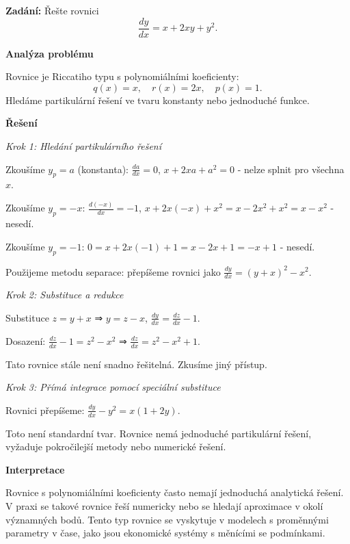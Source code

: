     \begin{example}
    \label{ex:l2-riccati-a2-lehky-linearni}
    
    \noindent\textbf{Zadání:} Řešte rovnici
    \[
    \frac{dy}{dx} = x + 2xy + y^2.
    \]
    
    \vspace{1.5\baselineskip}
    
    \noindent\textbf{Analýza problému}
    
    \noindent Rovnice je Riccatiho typu s polynomiálními koeficienty:
    \[
    q(x) = x, \quad r(x) = 2x, \quad p(x) = 1.
    \]
    Hledáme partikulární řešení ve tvaru konstanty nebo jednoduché funkce.
    
    \vspace{1.5\baselineskip}
    
    \noindent\textbf{Řešení}
    
    \noindent\textit{Krok 1: Hledání partikulárního řešení}
    
    Zkoušíme $y_p = a$ (konstanta): 
    $\frac{da}{dx} = 0$, $x + 2xa + a^2 = 0$ - nelze splnit pro všechna $x$.
    
    Zkoušíme $y_p = -x$: 
    $\frac{d(-x)}{dx} = -1$, $x + 2x(-x) + x^2 = x - 2x^2 + x^2 = x - x^2$ - nesedí.
    
    Zkoušíme $y_p = -1$: 
    $0 = x + 2x(-1) + 1 = x - 2x + 1 = -x + 1$ - nesedí.
    
    Použijeme metodu separace: přepíšeme rovnici jako $\frac{dy}{dx} = (y + x)^2 - x^2$.
    
    \noindent\textit{Krok 2: Substituce a redukce}
    
    Substituce $z = y + x$ ⇒ $y = z - x$, $\frac{dy}{dx} = \frac{dz}{dx} - 1$.
    
    Dosazení: $\frac{dz}{dx} - 1 = z^2 - x^2$ ⇒ $\frac{dz}{dx} = z^2 - x^2 + 1$.
    
    Tato rovnice stále není snadno řešitelná. Zkusíme jiný přístup.
    
    \noindent\textit{Krok 3: Přímá integrace pomocí speciální substituce}
    
    Rovnici přepíšeme: $\frac{dy}{dx} - y^2 = x(1 + 2y)$.
    
    Toto není standardní tvar. Rovnice nemá jednoduché partikulární řešení, 
    vyžaduje pokročilejší metody nebo numerické řešení.
    
    \vspace{1.5\baselineskip}
    
    \noindent\textbf{Interpretace}
    
    Rovnice s polynomiálními koeficienty často nemají jednoduchá analytická řešení. 
    V praxi se takové rovnice řeší numericky nebo se hledají aproximace v okolí 
    významných bodů. Tento typ rovnice se vyskytuje v modelech s proměnnými parametry 
    v čase, jako jsou ekonomické systémy s měnícími se podmínkami.
    
    \end{example}
    
